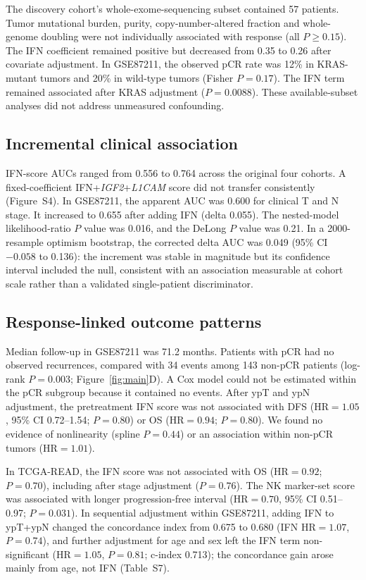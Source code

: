 \documentclass[11pt,a4paper]{article}
\begin{document}
The discovery cohort's whole-exome-sequencing subset contained 57 patients. Tumor mutational burden, purity, copy-number-altered fraction and whole-genome doubling were not individually associated with response (all $P\geq0.15$). The IFN coefficient remained positive but decreased from 0.35 to 0.26 after covariate adjustment. In GSE87211, the observed pCR rate was 12\% in KRAS-mutant tumors and 20\% in wild-type tumors (Fisher $P=0.17$). The IFN term remained associated after KRAS adjustment ($P=0.0088$). These available-subset analyses did not address unmeasured confounding.

\subsection{Incremental clinical association}

IFN-score AUCs ranged from 0.556 to 0.764 across the original four cohorts. A fixed-coefficient IFN+\textit{IGF2}+\textit{L1CAM} score did not transfer consistently (Figure~S4). In GSE87211, the apparent AUC was 0.600 for clinical T and N stage. It increased to 0.655 after adding IFN (delta 0.055). The nested-model likelihood-ratio $P$ value was 0.016, and the DeLong $P$ value was 0.21. In a 2000-resample optimism bootstrap, the corrected delta AUC was 0.049 (95\% CI $-0.058$ to 0.136): the increment was stable in magnitude but its confidence interval included the null, consistent with an association measurable at cohort scale rather than a validated single-patient discriminator.

\subsection{Response-linked outcome patterns}

Median follow-up in GSE87211 was 71.2 months. Patients with pCR had no observed recurrences, compared with 34 events among 143 non-pCR patients (log-rank $P=0.003$; Figure~\ref{fig:main}D). A Cox model could not be estimated within the pCR subgroup because it contained no events. After ypT and ypN adjustment, the pretreatment IFN score was not associated with DFS (HR$=1.05$, 95\% CI 0.72--1.54; $P=0.80$) or OS (HR$=0.94$; $P=0.80$). We found no evidence of nonlinearity (spline $P=0.44$) or an association within non-pCR tumors (HR$=1.01$).

In TCGA-READ, the IFN score was not associated with OS (HR$=0.92$; $P=0.70$), including after stage adjustment ($P=0.76$). The NK marker-set score was associated with longer progression-free interval (HR$=0.70$, 95\% CI 0.51--0.97; $P=0.031$). In sequential adjustment within GSE87211, adding IFN to ypT+ypN changed the concordance index from 0.675 to 0.680 (IFN HR$=1.07$, $P=0.74$), and further adjustment for age and sex left the IFN term non-significant (HR$=1.05$, $P=0.81$; c-index 0.713); the concordance gain arose mainly from age, not IFN (Table~S7).
\end{document}
